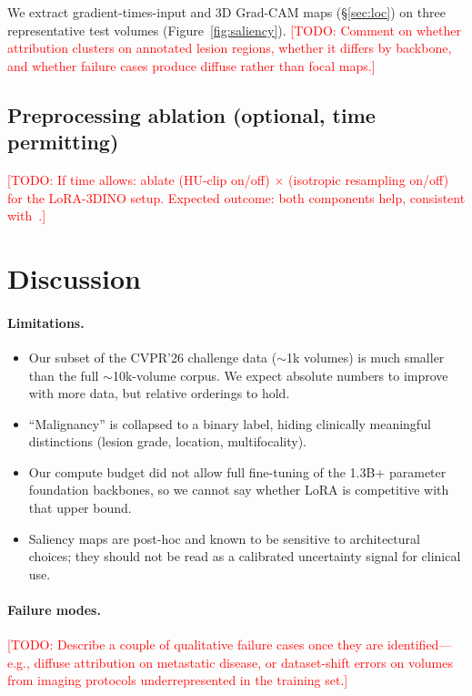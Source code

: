 \documentclass{article}
\newcommand{\TODO}[1]{\textcolor{red}{[TODO: #1]}}
\begin{document}
We extract gradient-times-input and 3D Grad-CAM maps
(\S\ref{sec:loc}) on three representative test volumes
(Figure~\ref{fig:saliency}). \TODO{Comment on whether attribution
clusters on annotated lesion regions, whether it differs by backbone,
and whether failure cases produce diffuse rather than focal maps.}

\subsection{Preprocessing ablation (optional, time permitting)}

\TODO{If time allows: ablate (HU-clip on/off) $\times$ (isotropic
resampling on/off) for the LoRA-3DINO setup. Expected outcome: both
components help, consistent with~\citet{thakral2025_lowdose,isensee2021_nnunet}.}

\section{Discussion}

\paragraph{Limitations.}
\begin{itemize}
\item Our subset of the CVPR'26 challenge data ($\sim$1k volumes) is
  much smaller than the full \mbox{$\sim$10k}-volume corpus. We expect
  absolute numbers to improve with more data, but relative orderings to
  hold.
\item ``Malignancy'' is collapsed to a binary label, hiding clinically
  meaningful distinctions (lesion grade, location, multifocality).
\item Our compute budget did not allow full fine-tuning of the 1.3B+
  parameter foundation backbones, so we cannot say whether LoRA is
  competitive with that upper bound.
\item Saliency maps are post-hoc and known to be sensitive to
  architectural choices; they should not be read as a calibrated
  uncertainty signal for clinical use.
\end{itemize}

\paragraph{Failure modes.}
\TODO{Describe a couple of qualitative failure cases once they are
identified---e.g., diffuse attribution on metastatic disease, or
dataset-shift errors on volumes from imaging protocols underrepresented
in the training set.}
\end{document}
